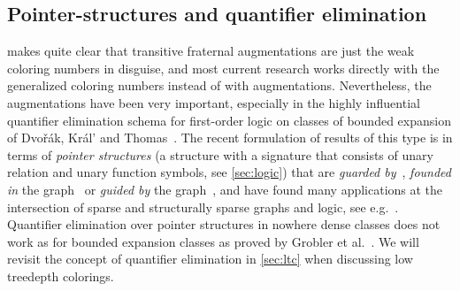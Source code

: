\documentclass[1p,number,a4paper]{elsarticle}
\theoremstyle{remark}
\newcommand{\Oof}{\mathcal{O}}
\newtheorem{corollary}[theorem]{Corollary}
\newtheorem{lemma}[theorem]{Lemma}
\begin{document}
%

\subsection{Pointer-structures and quantifier elimination}

 makes quite clear that transitive fraternal augmentations are just the weak coloring numbers in disguise, and most current research works directly with the generalized coloring numbers instead of with augmentations. 
Nevertheless, the augmentations have been very important, especially in the highly influential quantifier elimination schema for first-order logic on classes of bounded expansion of Dvo\v{r}\'ak, Kr\'al' and Thomas~\cite{dvovrak2013testing}. The recent formulation of results of this type is in terms of \emph{pointer structures} (a structure with a signature that consists of unary relation and unary function symbols, see \cref{sec:logic}) that are \emph{guarded by}~\cite{dvovrak2013testing}, \emph{founded in} the graph~\cite{grobler2021discrepancy} or \emph{guided by} the graph~\cite{nevsetvril2023modulo}, and have found many applications at the intersection of sparse and structurally sparse graphs and logic, see e.g.~\cite{dreier2020two,dreier2021approximate,dvovrak2013testing,grobler2021discrepancy,kazana2013enumeration,nevsetvril2023modulo,PilipczukST18,segoufin2017constant,vigny2018query}. 
Quantifier elimination over pointer structures in nowhere dense classes does not work as for bounded expansion classes as proved by Grobler et al.~\cite{grobler2021discrepancy}. We will revisit the concept of quantifier elimination in \cref{sec:ltc} when discussing low treedepth colorings. 
\end{document}
